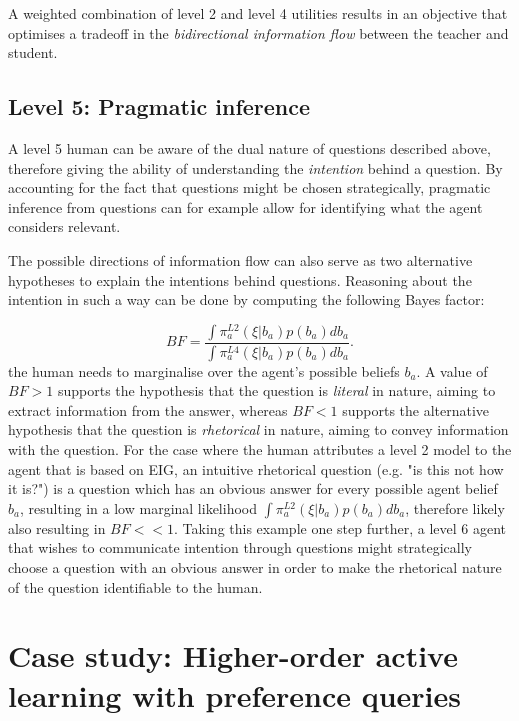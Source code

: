 \documentclass[letterpaper]{article} %
\begin{document}
A weighted combination of level 2 and level 4 utilities results in an objective that optimises a tradeoff in the \textit{bidirectional information flow} between the teacher and student.

\subsection{Level 5: Pragmatic inference}

A level 5 human can be aware of the dual nature of questions described above, therefore giving the ability of understanding the \textit{intention} behind a question. By accounting for the fact that questions might be chosen strategically, pragmatic inference from questions can for example allow for identifying what the agent considers relevant.

The possible directions of information flow can also serve as two alternative hypotheses to explain the intentions behind questions. Reasoning about the intention in such a way can be done by computing the following Bayes factor:

\begin{equation}
    BF = \frac{\int\pi_a^{L2}(\xi | b_a)p(b_a)db_a}{\int\pi_a^{L4}(\xi | b_a)p(b_a)db_a}.
\end{equation}
 the human needs to marginalise over the agent's possible beliefs $b_a$. A value of $BF>1$ supports the hypothesis that the question is \textit{literal} in nature, aiming to extract information from the answer, whereas $BF<1$ supports the alternative hypothesis that the question is \textit{rhetorical} in nature, aiming to convey information with the question. For the case where the human attributes a level 2 model to the agent that is based on EIG, an intuitive rhetorical question (e.g. "is this not how it is?") is a question which has an obvious answer for every possible agent belief $b_a$, resulting in a low marginal likelihood $\int\pi_a^{L2}(\xi | b_a)p(b_a)db_a$, therefore likely also resulting in $BF << 1$. Taking this example one step further, a level 6 agent that wishes to communicate intention through questions might strategically choose a question with an obvious answer in order to make the rhetorical nature of the question identifiable to the human.

\section{Case study: Higher-order active learning with preference queries}
\end{document}
